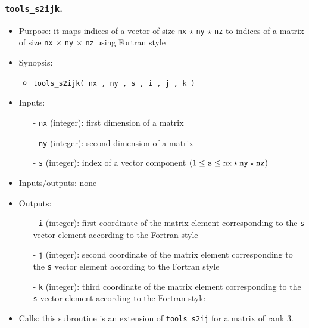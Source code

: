 \documentclass[12pt]{article}
\begin{document}
\subsubsection{{\tt tools\_s2ijk}.}
\begin{itemize}
\item Purpose: it maps indices of a vector of size {\tt nx} $\star$ {\tt ny} $\star$ {\tt nz} to indices of a matrix of size {\tt nx} $\times$ {\tt ny} $\times$ {\tt nz} using Fortran style
\item Synopsis: 
\begin{itemize}
\item {\tt tools\_s2ijk( nx , ny , s , i , j , k )}
\end{itemize}
\item Inputs: 
\begin{itemize}
\item[-] {\tt nx} (integer): first dimension of a matrix
\item[-] {\tt ny} (integer): second dimension of a matrix
\item[-] {\tt s} (integer): index of a vector component $( 1 \leq {\tt s} \leq {\tt nx} \star {\tt ny} \star {\tt nz} )$
\end{itemize}
\item Inputs/outputs: none
\item Outputs:
\begin{itemize}
\item[-] {\tt i} (integer): first coordinate of the matrix element corresponding to the {\tt s} vector element according to the Fortran style 
\item[-] {\tt j} (integer): second coordinate of the matrix element corresponding to the {\tt s} vector element according to the Fortran style 
\item[-] {\tt k} (integer): third coordinate of the matrix element corresponding to the {\tt s} vector element according to the Fortran style 
\end{itemize}
\item Calls: this subroutine is an extension of {\tt tools\_s2ij} for a matrix of rank $3$.
\end{itemize} 

\end{document}
